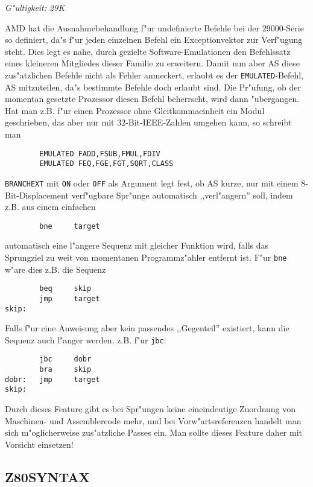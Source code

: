 \documentclass[12pt,a4paper,twoside]{report}
\makeatletter
\newcommand{\tty}[1]{{\tt #1}}
\newcommand{\ttindex}[1]{\index{#1@{\tt #1}}}
\makeatother
\begin{document}
{{\em G"ultigkeit: 29K}

AMD hat die Ausnahmebehandlung f"ur undefinierte Befehle bei der
29000-Serie so definiert, da"s f"ur jeden einzelnen Befehl ein
Exceptionvektor zur Verf"ugung steht.  Dies legt es nahe, durch
gezielte Software-Emulationen den Befehlssatz eines kleineren
Mitgliedes dieser Familie zu erweitern.  Damit nun aber AS diese
zus"atzlichen Befehle nicht als Fehler anmeckert, erlaubt es der
\tty{EMULATED}-Befehl, AS mitzuteilen, da"s bestimmte Befehle doch
erlaubt sind.  Die Pr"ufung, ob der momentan gesetzte Prozessor
diesen Befehl beherrscht, wird dann "ubergangen.  Hat man z.B. f"ur
einen Prozessor ohne Gleitkommaeinheit ein Modul geschrieben, das
aber nur mit 32-Bit-IEEE-Zahlen umgehen kann, so schreibt man
\begin{verbatim}
        EMULATED FADD,FSUB,FMUL,FDIV
        EMULATED FEQ,FGE,FGT,SQRT,CLASS
\end{verbatim}

{\tt BRANCHEXT} mit \tty{ON} oder \tty{OFF} als Argument legt fest, ob AS
kurze, nur mit einem 8-Bit-Displacement verf"ugbare Spr"unge automatisch
,,verl"angern'' soll, indem z.B. aus einem einfachen
\begin{verbatim}
        bne     target
\end{verbatim}
automatisch eine l"angere Sequenz mit gleicher Funktion wird, falls das
Sprungziel zu weit von momentanen Programmz"ahler entfernt ist.  F"ur
{\tt bne} w"are dies z.B. die Sequenz
\begin{verbatim}
        beq     skip
        jmp     target
skip:
\end{verbatim}
Falls f"ur eine Anweisung aber kein passendes ,,Gegenteil'' existiert,
kann die Sequenz auch l"anger werden, z.B. f"ur {\tt jbc}:
\begin{verbatim}
        jbc     dobr
        bra     skip
dobr:   jmp     target
skip:
\end{verbatim}
Durch dieses Feature gibt es bei Spr"ungen keine eineindeutige Zuordnung
von Maschinen- und Assemblercode mehr, und bei Vorw"artsreferenzen handelt
man sich m"oglicherweise zus"atzliche Passes ein.  Man sollte dieses
Feature daher mit Vorsicht einsetzen!


\subsection{Z80SYNTAX}
\ttindex{Z80SYNTAX}

}
\end{document}
